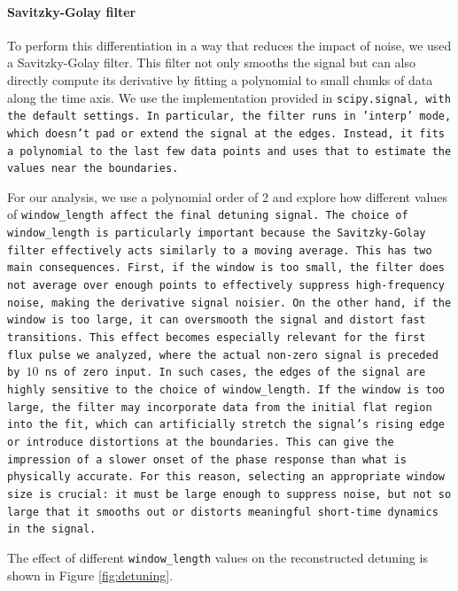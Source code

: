 \paragraph{Savitzky-Golay filter}
To perform this differentiation in a way that reduces the impact of noise, we used a Savitzky-Golay filter. 
This filter not only smooths the signal but can also directly compute its derivative by fitting a polynomial to small chunks of data along the time axis. 
We use the implementation provided in \tt{scipy.signal}, with the default settings. 
In particular, the filter runs in \tt{'interp'} mode, which doesn't pad or extend the signal at the edges. 
Instead, it fits a polynomial to the last few data points and uses that to estimate the values near the boundaries.

For our analysis, we use a polynomial order of 2 and explore how different values of \tt{window\_length} affect the final detuning signal. 
The choice of \texttt{window\_length} is particularly important because the Savitzky-Golay filter effectively acts similarly to a moving average. 
This has two main consequences. First, if the window is too small, the filter does not average over enough points to effectively suppress high-frequency noise, making the derivative signal noisier. 
On the other hand, if the window is too large, it can oversmooth the signal and distort fast transitions. 
This effect becomes especially relevant for the first flux pulse we analyzed, where the actual non-zero signal is preceded by $10$ ns of zero input. 
In such cases, the edges of the signal are highly sensitive to the choice of \tt{window\_length}. 
If the window is too large, the filter may incorporate data from the initial flat region into the fit, which can artificially stretch the signal's rising edge or introduce distortions at the boundaries. 
This can give the impression of a slower onset of the phase response than what is physically accurate. 
For this reason, selecting an appropriate window size is crucial: it must be large enough to suppress noise, but not so large that it smooths out or distorts meaningful short-time dynamics in the signal.

The effect of different \texttt{window\_length} values on the reconstructed detuning is shown in Figure \ref{fig:detuning}.

